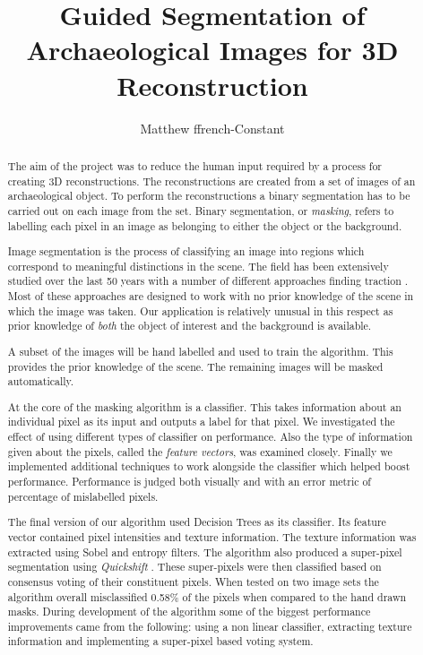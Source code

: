\documentclass[12pt]{IIBproject}
\begin{document}
\author{Matthew ffrench-Constant}
\title{Guided Segmentation of Archaeological Images for
3D Reconstruction}
\maketitle
\thispagestyle{empty}



\begin{abstract}
The aim of the project was to reduce the human input required by a process for creating 3D reconstructions. The reconstructions are created from a set of images of an archaeological object. To perform the reconstructions a binary segmentation has to be carried out on each image from the set. Binary segmentation, or \emph{masking}, refers to labelling each pixel in an image as belonging to either the object or the background.

 Image segmentation is the process of classifying an image into regions which correspond to meaningful distinctions in the scene. The field has been extensively studied over the last 50 years with a number of different approaches finding traction \cite{wang2008image}. Most of these approaches are designed to work with no prior knowledge of the scene in which the image was taken. Our application is relatively unusual in this respect as prior knowledge of \emph{both} the object of interest and the background is available. 

A subset of the images will be hand labelled and used to train the algorithm. This provides the prior knowledge of the scene. The remaining images will be masked automatically.

At the core of the masking algorithm is a classifier. This takes information about an individual pixel as its input and outputs a label for that pixel. We investigated the effect of using different types of classifier on performance. Also the type of information given about the pixels, called the \emph{feature vectors}, was examined closely. Finally we implemented additional techniques to work alongside the classifier which helped boost performance. Performance is judged both visually and with an error metric of percentage of mislabelled pixels.

The final version of our algorithm used Decision Trees as its classifier. Its feature vector contained pixel intensities and texture information. The texture information was extracted using Sobel and entropy filters. The algorithm also produced a super-pixel segmentation using \emph{Quickshift} \cite{vedaldi2008quick}. These super-pixels were then classified based on consensus voting of their constituent pixels. 
When tested on two image sets the algorithm overall misclassified 0.58\% of the pixels  when compared to the hand drawn masks. During development of the algorithm some of the biggest performance improvements came from the following: using a non linear classifier, extracting texture information and implementing a super-pixel based voting system. 


\end{abstract}
\end{document}
